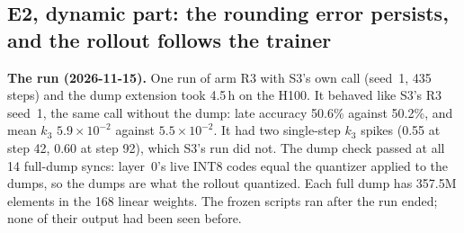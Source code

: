 \documentclass[11pt]{article}
\begin{document}
\subsection{E2, dynamic part: the rounding error persists, and the rollout follows the trainer}\label{sec:e2-dyn}
\textbf{The run (2026-11-15).} One run of arm R3 with S3's own call (seed~1, 435 steps) and the dump extension took 4.5\,h on the H100. It behaved like S3's R3 seed~1, the same call without the dump: late accuracy 50.6\% against 50.2\%, and mean $k_3$ $5.9\times10^{-2}$ against $5.5\times10^{-2}$. It had two single-step $k_3$ spikes (0.55 at step 42, 0.60 at step 92), which S3's run did not. The dump check passed at all 14 full-dump syncs: layer~0's live INT8 codes equal the quantizer applied to the dumps, so the dumps are what the rollout quantized. Each full dump has 357.5M elements in the 168 linear weights. The frozen scripts ran after the run ended; none of their output had been seen before.
\end{document}
